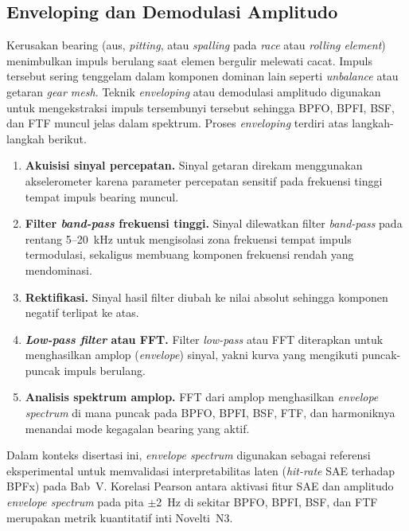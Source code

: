 {\color{blue}
\subsection{Enveloping dan Demodulasi Amplitudo}
\label{subsec:bab3_enveloping}

Kerusakan bearing (aus, \emph{pitting}, atau \emph{spalling} pada \emph{race}
atau \emph{rolling element}) menimbulkan impuls berulang saat elemen bergulir melewati
cacat. Impuls tersebut sering tenggelam dalam komponen dominan lain seperti
\emph{unbalance} atau getaran \emph{gear mesh}. Teknik \emph{enveloping} atau
demodulasi amplitudo digunakan untuk mengekstraksi impuls tersembunyi tersebut
sehingga BPFO, BPFI, BSF, dan FTF muncul jelas dalam spektrum. Proses
\emph{enveloping} terdiri atas langkah-langkah berikut.
}

{\color{blue}
\begin{enumerate}
  \item \textbf{Akuisisi sinyal percepatan.} Sinyal getaran direkam menggunakan
        akselerometer karena parameter percepatan sensitif pada frekuensi tinggi
        tempat impuls bearing muncul.
  \item \textbf{Filter \emph{band-pass} frekuensi tinggi.} Sinyal dilewatkan
        filter \emph{band-pass} pada rentang 5--20~kHz untuk mengisolasi zona
        frekuensi tempat impuls termodulasi, sekaligus membuang komponen
        frekuensi rendah yang mendominasi.
  \item \textbf{Rektifikasi.} Sinyal hasil filter diubah ke nilai absolut
        sehingga komponen negatif terlipat ke atas.
  \item \textbf{\emph{Low-pass filter} atau FFT.} Filter \emph{low-pass}
        atau FFT diterapkan untuk menghasilkan amplop (\emph{envelope}) sinyal,
        yakni kurva yang mengikuti puncak-puncak impuls berulang.
  \item \textbf{Analisis spektrum amplop.} FFT dari amplop menghasilkan
        \emph{envelope spectrum} di mana puncak pada BPFO, BPFI, BSF, FTF, dan
        harmoniknya menandai mode kegagalan bearing yang aktif.
\end{enumerate}
}

{\color{blue}
Dalam konteks disertasi ini, \emph{envelope spectrum} digunakan sebagai
referensi eksperimental untuk memvalidasi interpretabilitas laten
(\emph{hit-rate} SAE terhadap BPFx) pada Bab~V. Korelasi Pearson antara
aktivasi fitur SAE dan amplitudo \emph{envelope spectrum} pada pita
$\pm$2~Hz di sekitar BPFO, BPFI, BSF, dan FTF merupakan metrik kuantitatif
inti Novelti~N3.
}


